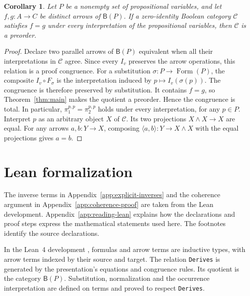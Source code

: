 \documentclass[11pt]{article}
\newtheorem{corollary}[theorem]{Corollary}
\newcommand{\B}{\mathsf B}
\newcommand{\FormulaSet}{\operatorname{Form}}
\begin{document}
\begin{corollary}\label{cor:models}
Let $P$ be a nonempty set of propositional variables, and let
$f,g:A\to C$ be distinct arrows of $\B(P)$.
If a zero-identity Boolean category $\mathcal C$ satisfies $f=g$
under every interpretation of the propositional variables, then
$\mathcal C$ is a preorder.
\end{corollary}

\begin{proof}
Declare two parallel arrows of $\B(P)$ equivalent when all their
interpretations in $\mathcal C$ agree. Since every $I_v$ preserves
the arrow operations, this relation is a proof congruence. For a
substitution $\sigma:P\to\FormulaSet(P)$, the composite
$I_v\circ F_\sigma$ is the interpretation induced by
$p\mapsto I_v(\sigma(p))$. The congruence is therefore preserved
by substitution. It contains $f=g$, so
Theorem~\ref{thm:main} makes the quotient a preorder. Hence the
congruence is total. In particular,
$\pi_1^{p,p}=\pi_2^{p,p}$ holds under every interpretation, for any
$p\in P$. Interpret $p$ as an arbitrary object $X$ of $\mathcal C$.
Its two projections $X\wedge X\to X$ are equal. For any arrows $a,b:Y\to X$, composing
$\langle a,b\rangle:Y\to X\wedge X$ with the equal projections gives $a=b$.
\end{proof}

\section{Lean formalization}\label{sec:formalization}

The inverse terms in Appendix~\ref{app:explicit-inverses} and the
coherence argument in Appendix~\ref{app:coherence-proof} are taken
from the Lean development. Appendix~\ref{app:reading-lean}
explains how the declarations and proof steps express the mathematical
statements used here. The footnotes identify the source declarations.

In the Lean~4 development \cite{Formalization}, formulas and arrow
terms are inductive types, with arrow terms indexed by their source
and target. The relation \texttt{Derives} is generated by the
presentation's equations and congruence rules. Its quotient is the
category $\B(P)$. Substitution, normalization and the occurrence
interpretation are defined on terms and proved to respect
\texttt{Derives}.
\end{document}
